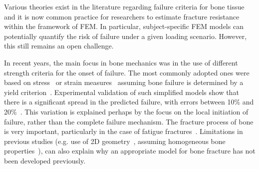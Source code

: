 \documentclass[onecolumn]{svjour3}
\begin{document}
Various theories exist in the literature regarding failure criteria for bone tissue and it is now common practice for researchers to estimate fracture resistance within the framework of FEM. In particular, subject-specific FEM models can potentially quantify the risk of failure under a given loading scenario. However, this still remains an open challenge.

In recent years, the main focus in bone mechanics was in the use of different strength criteria for the onset of failure. 
The most commonly adopted ones were based on stress~\cite{keyak2005predicting} or strain measures~\cite{schileo2008subject} assuming bone failure is determined by a yield criterion~\cite{yosibash2010predicting}. 
Experimental validation of such simplified models show that there is a significant spread in the predicted failure, with errors between 10\% and 20\%~\cite{van2014accurately}.
This variation is explained perhaps by the focus on the local initiation of failure, rather than the complete failure mechanism. 
The fracture process of bone is very important,  particularly in the case of fatigue fractures~\cite{gupta2008fracture}. 
Limitations in previous studies (e.g. use of 2D geometry~\cite{bettamer2017using}, assuming homogeneous bone properties~\cite{gasser2007numerical}), 
can also explain why an appropriate model for bone fracture has not been developed previously.
\end{document}
